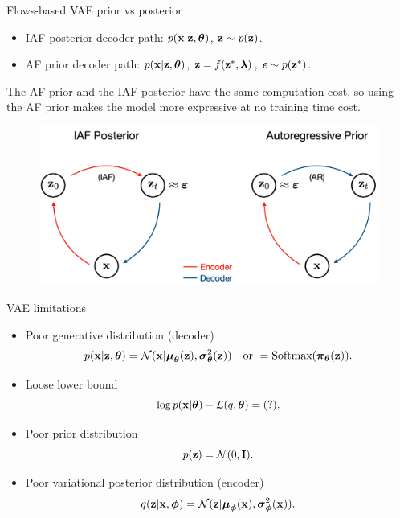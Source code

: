\begin{frame}{Flows-based VAE prior vs posterior}
	\begin{itemize}
		\item IAF posterior decoder path: $p(\mathbf{x}|\mathbf{z}, \boldsymbol{\theta})$, $\mathbf{z} \sim p(\mathbf{z})$.
		\item AF prior decoder path: $p(\mathbf{x}|\mathbf{z}, \boldsymbol{\theta})$, $\mathbf{z} = f(\mathbf{z}^*, \boldsymbol{\lambda})$, $\boldsymbol{\epsilon} \sim p(\mathbf{z}^*)$. 
	\end{itemize}
	The AF prior and the IAF posterior have the same computation cost, so using the AF prior makes the model more expressive at no training time cost.

	\begin{figure}
		\includegraphics[width=0.85\linewidth]{figs/prior_vs_posterior}
	\end{figure}

\end{frame}
\begin{frame}{VAE limitations}
	\begin{itemize}
		\item Poor generative distribution (decoder)
		\[
			p(\mathbf{x} | \mathbf{z}, \boldsymbol{\theta}) = \mathcal{N}(\mathbf{x}| \boldsymbol{\mu}_{\boldsymbol{\theta}}(\mathbf{z}), \boldsymbol{\sigma}^2_{\boldsymbol{\theta}}(\mathbf{z})) \quad \text{or } = \text{Softmax}(\boldsymbol{\pi}_{\boldsymbol{\theta}}(\mathbf{z})).
		\]
		\item Loose lower bound
		\[
			\log p(\mathbf{x} | \boldsymbol{\theta}) - \mathcal{L}(q, \boldsymbol{\theta}) = (?).
		\]
		\item Poor prior distribution
		\[
			p(\mathbf{z}) = \mathcal{N}(0, \mathbf{I}).
		\]
		\item Poor variational posterior distribution (encoder)
		\[
			q(\mathbf{z} | \mathbf{x}, \boldsymbol{\phi}) = \mathcal{N}(\mathbf{z}| \boldsymbol{\mu}_{\boldsymbol{\phi}}(\mathbf{x}), \boldsymbol{\sigma}^2_{\boldsymbol{\phi}}(\mathbf{x})).
		\]
	\end{itemize}
\end{frame}
